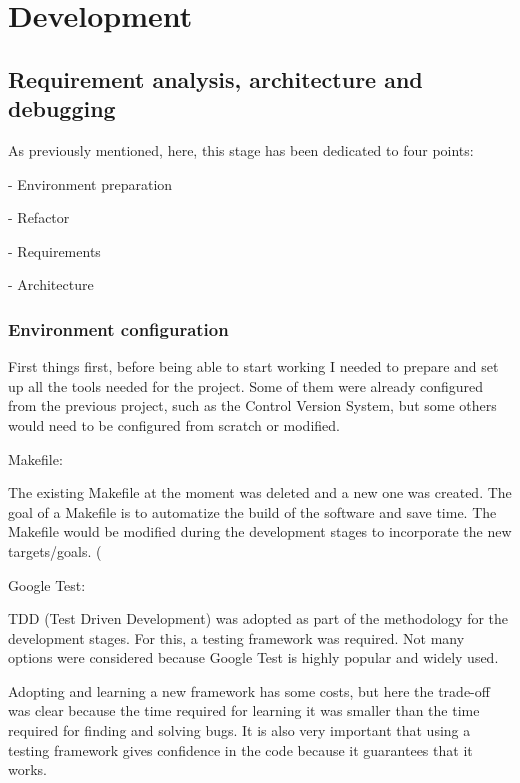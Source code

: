 \chapter{Development} 
\label{Chapter3}

\section{Requirement analysis, architecture and debugging} 
As previously mentioned, here, this stage has been dedicated to four points: 

- Environment preparation 

- Refactor 

- Requirements 

- Architecture 

\subsection{Environment configuration}
First things first, before being able to start working I needed to prepare and set up all the tools needed for the project. Some of them were already configured from the previous project, such as the Control Version System, but some others would need to be configured from scratch or modified.  



Makefile: 

The existing Makefile at the moment was deleted and a new one was created. The goal of a Makefile is to automatize the build of the software and save time. The Makefile would be modified during the development stages to incorporate the new targets/goals. (%



Google Test: 

TDD (Test Driven Development) was adopted as part of the methodology for the development stages. For this, a testing framework was required. Not many options were considered because Google Test is highly popular and widely used.  






Adopting and learning a new framework has some costs, but here the trade-off was clear because the time required for learning it was smaller than the time required for finding and solving bugs. It is also very important that using a testing framework gives confidence in the code because it guarantees that it works.  

